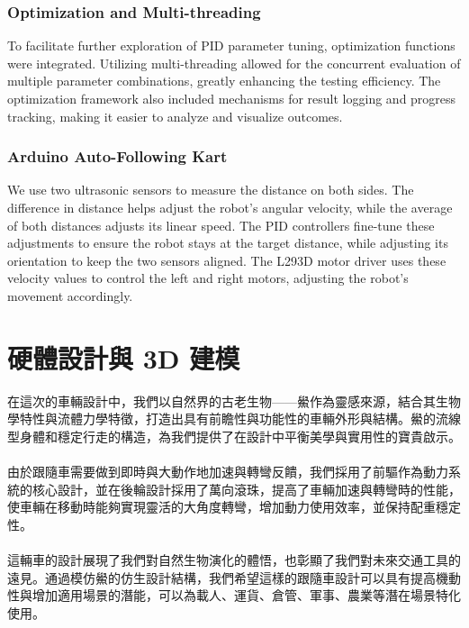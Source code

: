 \documentclass[a4paper,12pt]{article}
\begin{document}
\begin{lstlising}[language=C++]
\subsubsection{Optimization and Multi-threading}
To facilitate further exploration of PID parameter tuning, optimization functions were integrated. Utilizing multi-threading allowed for the concurrent evaluation of multiple parameter combinations, greatly enhancing the testing efficiency. The optimization framework also included mechanisms for result logging and progress tracking, making it easier to analyze and visualize outcomes.
\subsubsection{Arduino Auto-Following Kart}
We use two ultrasonic sensors to measure the distance on both sides. The difference in distance helps adjust the robot's angular velocity, while the average of both distances adjusts its linear speed. The PID controllers fine-tune these adjustments to ensure the robot stays at the target distance, while adjusting its orientation to keep the two sensors aligned. The L293D motor driver uses these velocity values to control the left and right motors, adjusting the robot's movement accordingly.

\section{硬體設計與 3D 建模}
在這次的車輛設計中，我們以自然界的古老生物——鱟作為靈感來源，結合其生物學特性與流體力學特徵，打造出具有前瞻性與功能性的車輛外形與結構。鱟的流線型身體和穩定行走的構造，為我們提供了在設計中平衡美學與實用性的寶貴啟示。\\\\
由於跟隨車需要做到即時與大動作地加速與轉彎反饋，我們採用了前驅作為動力系統的核心設計，並在後輪設計採用了萬向滾珠，提高了車輛加速與轉彎時的性能，使車輛在移動時能夠實現靈活的大角度轉彎，增加動力使用效率，並保持配重穩定性。\\\\
這輛車的設計展現了我們對自然生物演化的體悟，也彰顯了我們對未來交通工具的遠見。通過模仿鱟的仿生設計結構，我們希望這樣的跟隨車設計可以具有提高機動性與增加適用場景的潛能，可以為載人、運貨、倉管、軍事、農業等潛在場景特化使用。

\end{lstlising}
\end{document}
